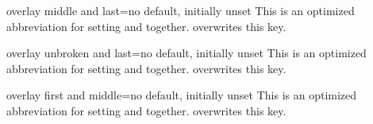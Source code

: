 \begin{docTcbKey}{overlay middle and last}{=}{no default, initially unset}
  This is an optimized abbreviation for setting
   and
   together.
   overwrites this key.
\end{docTcbKey}

\begin{docTcbKey}{overlay unbroken and last}{=}{no default, initially unset}
  This is an optimized abbreviation for setting
   and
   together.
   overwrites this key.
\end{docTcbKey}

\begin{docTcbKey}[][doc new=2014-09-19]{overlay first and middle}{=}{no default, initially unset}
  This is an optimized abbreviation for setting
   and
   together.
   overwrites this key.
\end{docTcbKey}


